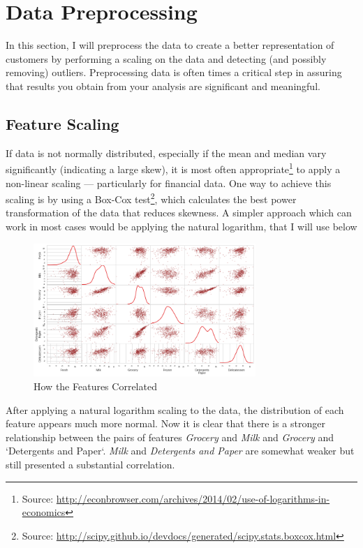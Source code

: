 \documentclass[a4paper]{article}
\begin{document}
\section{Data Preprocessing}
\label{sec:data_preprocessing}
In this section, I will preprocess the data to create a better representation of customers by performing a scaling on the data and detecting (and possibly removing) outliers. Preprocessing data is often times a critical step in assuring that results you obtain from your analysis are significant and meaningful.


\subsection{Feature Scaling}
If data is not normally distributed, especially if the mean and median vary significantly (indicating a large skew), it is most often appropriate\footnote{Source: \url{http://econbrowser.com/archives/2014/02/use-of-logarithms-in-economics}} to apply a non-linear scaling — particularly for financial data. One way to achieve this scaling is by using a Box-Cox test\footnote{Source: \url{http://scipy.github.io/devdocs/generated/scipy.stats.boxcox.html}}, which calculates the best power transformation of the data that reduces skewness. A simpler approach which can work in most cases would be applying the natural logarithm, that I will use below

\begin{figure}[ht!]
\centering
\includegraphics[width=0.75\textwidth]{figures/scatter_matrix_log.png}
\caption{\label{fig:log_scatter_matrix}How the Features Correlated}
\end{figure}

After applying a natural logarithm scaling to the data, the distribution of each feature appears much more normal. Now it is clear that there is a stronger relationship between the pairs of features \textit{Grocery} and \textit{Milk} and \textit{Grocery} and `Detergents and Paper`. \textit{Milk} and \textit{Detergents and Paper} are somewhat weaker but still presented a substantial correlation.
\end{document}
